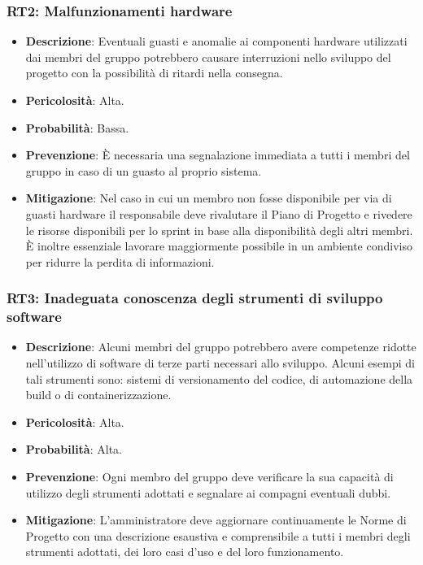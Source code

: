 \subsubsection{RT2: Malfunzionamenti hardware}
\begin{itemize}
    \item \textbf{Descrizione}: Eventuali guasti e anomalie ai componenti hardware utilizzati dai membri del gruppo potrebbero causare 
    interruzioni nello sviluppo del progetto con la possibilità di ritardi nella consegna.
    \item \textbf{Pericolosità}: Alta.
    \item \textbf{Probabilità}: Bassa.
    \item \textbf{Prevenzione}: È necessaria una segnalazione immediata a tutti i membri del gruppo in caso di un guasto al proprio sistema.
    \item \textbf{Mitigazione}: Nel caso in cui un membro non fosse disponibile per via di guasti hardware il responsabile deve  rivalutare il Piano di Progetto e rivedere le risorse disponibili per lo sprint in base alla disponibilità degli altri membri.
    È inoltre essenziale lavorare maggiormente possibile in un ambiente condiviso per ridurre la perdita di informazioni.
\end{itemize}

\subsubsection{RT3: Inadeguata conoscenza degli strumenti di sviluppo software}
\begin{itemize}
    \item \textbf{Descrizione}: Alcuni membri del gruppo potrebbero avere competenze ridotte nell'utilizzo di software di terze parti necessari allo sviluppo.
    Alcuni esempi di tali strumenti sono: sistemi di versionamento del codice, di automazione della build o di containerizzazione. 
    \item \textbf{Pericolosità}: Alta.
    \item \textbf{Probabilità}: Alta.
    \item \textbf{Prevenzione}: Ogni membro del gruppo deve verificare la sua capacità di utilizzo degli strumenti adottati e segnalare ai compagni eventuali dubbi.
    \item \textbf{Mitigazione}: L'amministratore deve aggiornare continuamente le Norme di Progetto con una descrizione esaustiva e comprensibile a tutti i membri degli strumenti adottati, dei loro casi d'uso e del loro funzionamento.
\end{itemize}

